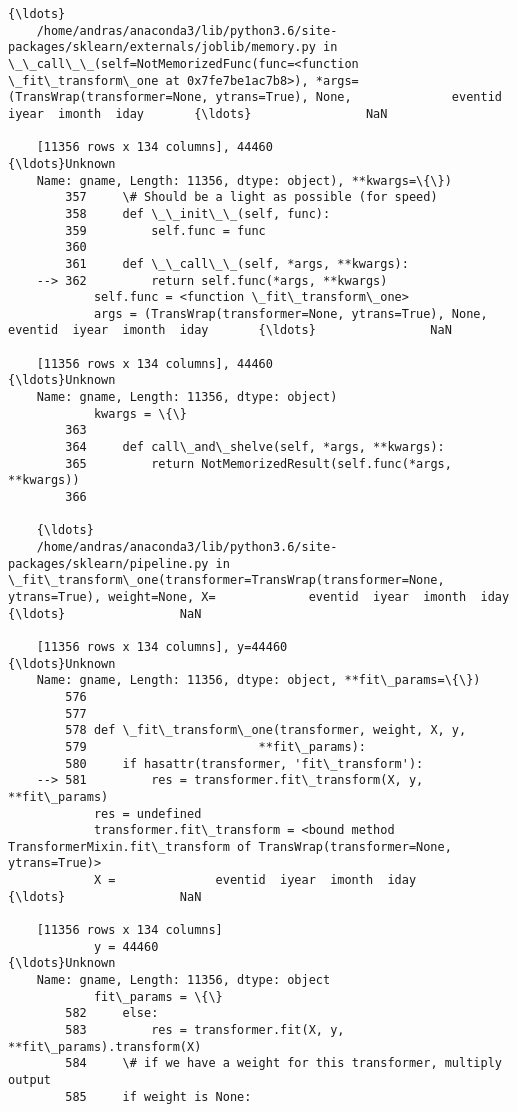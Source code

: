 \documentclass[11pt]{article}
\begin{document}
\begin{Verbatim}[commandchars=\\\{\}]
    {\ldots}
    /home/andras/anaconda3/lib/python3.6/site-packages/sklearn/externals/joblib/memory.py in \_\_call\_\_(self=NotMemorizedFunc(func=<function \_fit\_transform\_one at 0x7fe7be1ac7b8>), *args=(TransWrap(transformer=None, ytrans=True), None,              eventid  iyear  imonth  iday       {\ldots}                NaN  
    
    [11356 rows x 134 columns], 44460                                           {\ldots}Unknown
    Name: gname, Length: 11356, dtype: object), **kwargs=\{\})
        357     \# Should be a light as possible (for speed)
        358     def \_\_init\_\_(self, func):
        359         self.func = func
        360 
        361     def \_\_call\_\_(self, *args, **kwargs):
    --> 362         return self.func(*args, **kwargs)
            self.func = <function \_fit\_transform\_one>
            args = (TransWrap(transformer=None, ytrans=True), None,              eventid  iyear  imonth  iday       {\ldots}                NaN  
    
    [11356 rows x 134 columns], 44460                                           {\ldots}Unknown
    Name: gname, Length: 11356, dtype: object)
            kwargs = \{\}
        363 
        364     def call\_and\_shelve(self, *args, **kwargs):
        365         return NotMemorizedResult(self.func(*args, **kwargs))
        366 
    
    {\ldots}
    /home/andras/anaconda3/lib/python3.6/site-packages/sklearn/pipeline.py in \_fit\_transform\_one(transformer=TransWrap(transformer=None, ytrans=True), weight=None, X=             eventid  iyear  imonth  iday       {\ldots}                NaN  
    
    [11356 rows x 134 columns], y=44460                                           {\ldots}Unknown
    Name: gname, Length: 11356, dtype: object, **fit\_params=\{\})
        576 
        577 
        578 def \_fit\_transform\_one(transformer, weight, X, y,
        579                        **fit\_params):
        580     if hasattr(transformer, 'fit\_transform'):
    --> 581         res = transformer.fit\_transform(X, y, **fit\_params)
            res = undefined
            transformer.fit\_transform = <bound method TransformerMixin.fit\_transform of TransWrap(transformer=None, ytrans=True)>
            X =              eventid  iyear  imonth  iday       {\ldots}                NaN  
    
    [11356 rows x 134 columns]
            y = 44460                                           {\ldots}Unknown
    Name: gname, Length: 11356, dtype: object
            fit\_params = \{\}
        582     else:
        583         res = transformer.fit(X, y, **fit\_params).transform(X)
        584     \# if we have a weight for this transformer, multiply output
        585     if weight is None:
    

\end{Verbatim}
\end{document}
